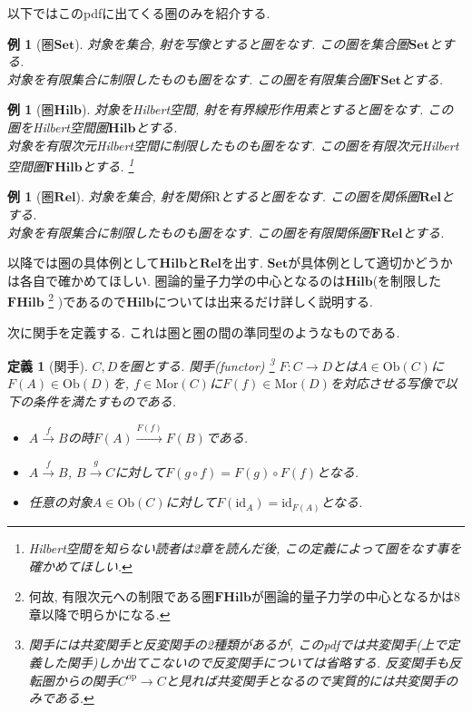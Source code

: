 \documentclass[a4paper,12pt]{ltjsarticle}
\theoremstyle{break}
\newtheorem{defn}[thm]{定義}
\newtheorem{eg}[thm]{例}
\newcommand{\cset}{\mathbf{Set}}
\newcommand{\fset}{\mathbf{FSet}}
\newcommand{\rel}{\mathbf{Rel}}
\newcommand{\frel}{\mathbf{FRel}}
\newcommand{\hilb}{\mathbf{Hilb}}
\newcommand{\fhilb}{\mathbf{FHilb}}
\newcommand{\mrr}{\mathrm{R}}
\newcommand{\Ob}{\mathrm{Ob}}
\newcommand{\Mor}{\mathrm{Mor}}
\newcommand{\Op}{\mathrm{op}}
\newcommand{\xr}[1]{\xrightarrow{#1}}
\newcommand{\id}{\mathrm{id}}
\numberwithin{equation}{section}
\begin{document}
以下ではこのpdfに出てくる圏のみを紹介する. 

\begin{eg}[圏$\cset$]
  対象を集合, 射を写像とすると圏をなす. 
  この圏を集合圏$\cset$とする. \\
  対象を有限集合に制限したものも圏をなす. 
  この圏を有限集合圏$\fset$とする. 
\end{eg}  

\begin{eg}[圏$\hilb$]
  対象をHilbert空間, 射を有界線形作用素とすると圏をなす. 
  この圏をHilbert空間圏$\hilb$とする. \\
  対象を有限次元Hilbert空間に制限したものも圏をなす. 
  この圏を有限次元Hilbert空間圏$\fhilb$とする. 
  \footnote{
      Hilbert空間を知らない読者は2章を読んだ後, この定義によって圏をなす事を確かめてほしい.
    }
\end{eg} 

\begin{eg}[圏$\rel$]
  対象を集合, 射を関係$\mrr$とすると圏をなす. 
  この圏を関係圏$\rel$とする. \\
  対象を有限集合に制限したものも圏をなす. 
  この圏を有限関係圏$\frel$とする. 
\end{eg}  

以降では圏の具体例として$\hilb$と$\rel$を出す. 
$\cset$が具体例として適切かどうかは各自で確かめてほしい. 
圏論的量子力学の中心となるのは$\hilb$(を制限した$\fhilb$
\footnote{
    何故, 有限次元への制限である圏$\fhilb$が圏論的量子力学の中心となるかは8章以降で明らかになる.
  }
  )であるので$\hilb$については出来るだけ詳しく説明する. 

次に関手を定義する. 
これは圏と圏の間の準同型のようなものである. 

\begin{defn}[関手]
  $C, D$を圏とする. 
  関手(functor)
  \footnote{
    関手には共変関手と反変関手の2種類があるが, このpdfでは共変関手(上で定義した関手)しか出てこないので反変関手については省略する. 
    反変関手も反転圏からの関手$C^\Op \to C$と見れば共変関手となるので実質的には共変関手のみである.  
  }
  $F: C \to D$とは$A \in \Ob(C)$に$F(A) \in \Ob(D)$を, $f \in \Mor(C)$に$F(f) \in \Mor(D)$を対応させる写像で以下の条件を満たすものである. 
  \begin{itemize}
    \item $A \xr{f} B$の時$F(A) \xr{F(f)} F(B)$である. 
    \item $A \xr{f} B$, $B \xr{g} C$に対して$F(g \circ f) = F(g) \circ F(f)$となる.
    \item 任意の対象$A \in \Ob(C)$に対して$F(\id_A) = \id_{F(A)}$となる. 
  \end{itemize}
\end{defn}
\end{document}
